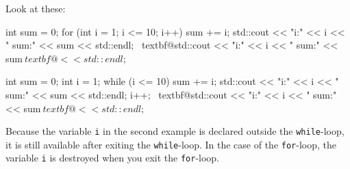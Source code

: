 Look at these:
\begin{console}[commandchars=\~\@\$]
int sum = 0;
for (int i = 1; i <= 10; i++)
{   
    sum += i;
    std::cout << "i:" << i << " sum:" << sum
              << std::endl;
}
~textbf@std::cout << "i:" << i << " sum:" << sum$
          ~textbf@<< std::endl;$
\end{console}
\begin{console}[commandchars=\~\@\$]
int sum = 0;
int i = 1;
while (i <= 10)
{     
      sum += i;
      std::cout << "i:" << i << " sum:" << sum <<
      std::endl;
      i++;
}
~textbf@std::cout << "i:" << i << " sum:" << sum$
          ~textbf@<< std::endl;$
\end{console}
Because the variable \texttt{i} in the second example is declared outside
the \texttt{while}-loop, it is still available after exiting the
\texttt{while}-loop. In the case of the \texttt{for}-loop, the variable
\texttt{i} is destroyed when you exit the \texttt{for}-loop.

\newpage{}

